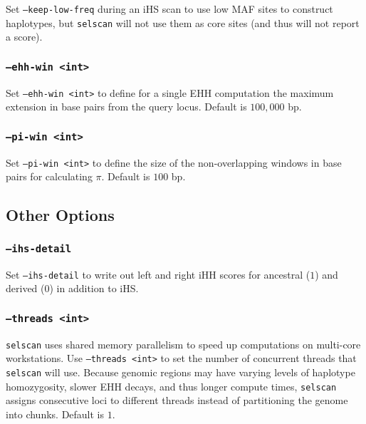 \documentclass[12pt]{article}%
\begin{document}
Set {\tt --keep-low-freq} during an iHS scan to use low MAF sites to construct haplotypes, but {\tt selscan} will not use them as core sites (and thus will not report a score).

\subsubsection{{\tt --ehh-win <int>}}

Set {\tt --ehh-win <int>} to define for a single EHH computation the maximum extension in base pairs from the query locus.  Default is $100,000$ bp.

\subsubsection{{\tt --pi-win <int>}}

Set {\tt --pi-win <int>} to define the size of the non-overlapping windows in base pairs for calculating $\pi$.  Default is $100$ bp.


\subsection{Other Options}

\subsubsection{{\tt --ihs-detail}}

Set {\tt--ihs-detail} to write out left and right iHH scores for ancestral ($1$) and derived ($0$) in addition to iHS.

\subsubsection{{\tt --threads <int>}}

{\tt selscan} uses shared memory parallelism to speed up computations on multi-core workstations.  Use {\tt --threads <int>} to set the number of concurrent threads that {\tt selscan} will use.  Because genomic regions may have varying levels of haplotype homozygosity, slower EHH decays, and thus longer compute times, {\tt selscan} assigns consecutive loci to different threads instead of partitioning the genome into chunks.  Default is $1$.

\end{document}
